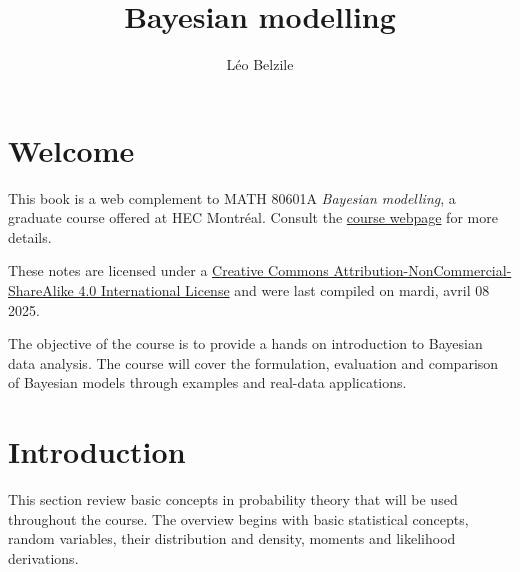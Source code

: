 \documentclass[
  11pt,
  letterpaper,
]{scrbook}
\title{Bayesian modelling}
\author{Léo Belzile}
\date{}
\renewcommand*\contentsname{Table of contents}
\newcommand\contentsname{Table of contents}
\theoremstyle{plain}
\theoremstyle{definition}
\theoremstyle{definition}
\theoremstyle{plain}
\theoremstyle{plain}
\theoremstyle{definition}
\theoremstyle{remark}
\begin{document}
\frontmatter
\maketitle

\renewcommand*\contentsname{Table of contents}
{
\setcounter{tocdepth}{2}
\tableofcontents
}

\mainmatter
{}

\chapter*{Welcome}\label{welcome}


This book is a web complement to MATH 80601A \emph{Bayesian modelling},
a graduate course offered at HEC Montréal. Consult the
\href{https://lbelzile.github.io/bayesmod}{course webpage} for more
details.

These notes are licensed under a
\href{http://creativecommons.org/licenses/by-nc-sa/4.0/}{Creative
Commons Attribution-NonCommercial-ShareAlike 4.0 International License}
and were last compiled on mardi, avril 08 2025.

The objective of the course is to provide a hands on introduction to
Bayesian data analysis. The course will cover the formulation,
evaluation and comparison of Bayesian models through examples and
real-data applications.


\chapter{Introduction}\label{introduction}

This section review basic concepts in probability theory that will be
used throughout the course. The overview begins with basic statistical
concepts, random variables, their distribution and density, moments and
likelihood derivations.
\end{document}
